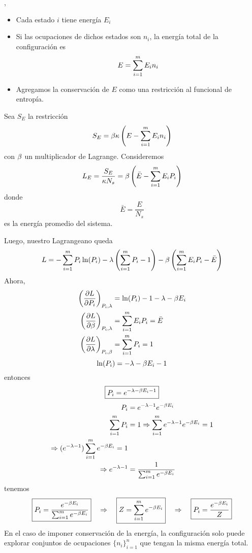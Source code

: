,
\begin{itemize}
	\item Cada estado $i$ tiene energía $E_i$
	\item Si las ocupaciones de dichos estados son $n_i$, la energía total de la configuración es
	\begin{equation}
  E=\sum_{i=1}^m E_in_i
\end{equation}
\item Agregamos la conservación de $E$ como una restricción al funcional de entropía.
\end{itemize}

Sea $S_E$ la restricción
\begin{equation}
  S_E=\beta \kappa \left(E-\sum_{i=1}^m E_in_i\right)
\end{equation}
con $\beta$ un multiplicador de Lagrange. Consideremos
\begin{equation}
  L_E=\frac{S_E}{\kappa N_s}=\beta \left(\bar{E}-\sum_{i=1}^m E_iP_i\right)
\end{equation}
donde 
\begin{equation}
  \bar{E}=\frac{E}{N_s}
\end{equation}
es la energía promedio del sistema.

Luego, nuestro Lagrangeano queda
\begin{equation}
  L=-\sum_{i=1}^m P_i\ln(P_i)-\lambda \left(\sum_{i=1}^m P_i-1\right)-\beta \left(\sum_{i=1}^m E_iP_i-\bar{E}\right)
\end{equation}
Ahora,
\begin{align}
  \left(\pdv{L}{P_i}\right)_{P_i,\lambda}&=\ln(P_i)-1-\lambda-\beta E_i\\
  \left(\pdv{L}{\beta}\right)_{P_i,\lambda}&=\sum_{i=1}^m E_iP_i=\bar{E}\\
  \left(\pdv{L}{\lambda}\right)_{P_i,\beta}&=\sum_{i=1}^m P_i=1
\end{align}
\begin{equation}
  \ln(P_i)=-\lambda-\beta E_i-1
\end{equation}
entonces
\begin{equation}
\boxed{  P_i=e^{-\lambda-\beta E_i-1}}
\end{equation}
\begin{align}
  P_i&=e^{-\lambda-1}e^{-\beta E_i}\\
  \sum_{i=1}^m P_i&=1\Rightarrow \sum_{i=1}^m e^{-\lambda-1}e^{-\beta E_i}=1\\
  \Rightarrow (e^{-\lambda-1})\sum_{i=1}^m e^{-\beta E_i}=1\\
  \Rightarrow e^{-\lambda-1}&=\frac{1}{\sum_{i=1}^m e^{-\beta E_i}}
\end{align}
tenemos
\begin{equation}
  \boxed{P_i=\frac{e^{-\beta E_i}}{\sum_{i=1}^m e^{-\beta E_i}}}\quad \Rightarrow\quad \boxed{Z=\sum_{i=1}^m e^{-\beta E_i}}\quad \Rightarrow\quad \boxed{P_i=\frac{e^{-\beta E_i}}{Z}}
\end{equation}
En el caso de imponer conservación de la energía, la configuración solo puede explorar conjuntos de ocupaciones $\{n_i\}_{i=1}^n$ que tengan la misma energía total.

